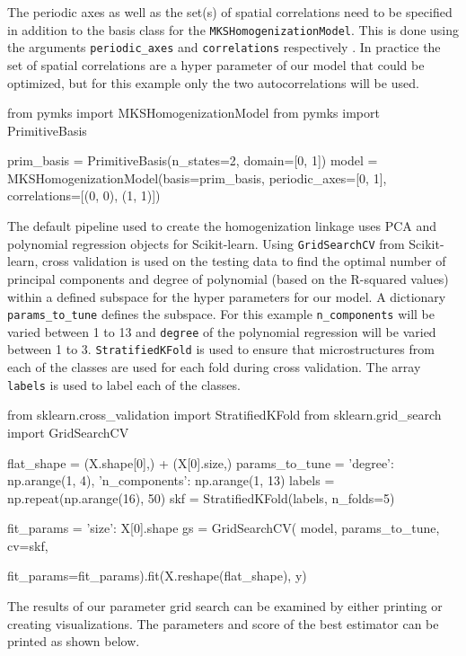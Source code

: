 \documentclass{bmcart}
\begin{document}
The periodic axes as well as the set(s) of spatial correlations need to be specified in addition to the basis class for the
\texttt{MKSHomogenizationModel}. This is done using the arguments
\texttt{periodic\_axes} and \texttt{correlations} respectively . In
practice the set of spatial correlations are a hyper parameter of our
model that could be optimized, but for this example only the two
autocorrelations will be used.


\begin{_input}
from pymks import MKSHomogenizationModel
from pymks import PrimitiveBasis

prim_basis = PrimitiveBasis(n_states=2, domain=[0, 1])
model = MKSHomogenizationModel(basis=prim_basis,
                               periodic_axes=[0, 1],
                               correlations=[(0, 0), (1, 1)])
\end{_input}

The default pipeline used to create the homogenization linkage uses
PCA and polynomial regression objects for Scikit-learn. Using
\texttt{GridSearchCV} from Scikit-learn, cross validation is used on
the testing data to find the optimal number of principal components
and degree of polynomial (based on the R-squared values) within a
defined subspace for the hyper parameters for our model. A dictionary
\texttt{params\_to\_tune} defines the subspace. For this example
\texttt{n\_components} will be varied between 1 to 13 and
\texttt{degree} of the polynomial regression will be varied between 1
to 3. \texttt{StratifiedKFold} is used to ensure that microstructures
from each of the classes are used for each fold during cross
validation. The array \texttt{labels} is used to label each of the
classes.

\begin{_input}
from sklearn.cross_validation import StratifiedKFold
from sklearn.grid_search import GridSearchCV

flat_shape = (X.shape[0],) + (X[0].size,)
params_to_tune = {'degree': np.arange(1, 4),
                  'n_components': np.arange(1, 13)}
labels = np.repeat(np.arange(16), 50)
skf = StratifiedKFold(labels, n_folds=5)

fit_params = {'size': X[0].shape}
gs = GridSearchCV(
    model, params_to_tune, cv=skf,
    \usepackage{courier}fit_params=fit_params).fit(X.reshape(flat_shape), y)

\end{_input}

The results of our parameter grid search can be examined by either
printing or creating visualizations. The parameters and score of the
best estimator can be printed as shown below.
\end{document}
